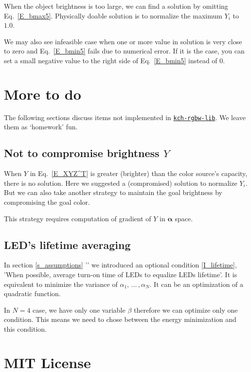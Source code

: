 \documentclass[dvipdfmx,uplatex,a4paper]{article}
\begin{document}
When the object brightness is too large, we can find a solution by omitting Eq.~\eqref{E_bmax5}. Physically doable solution is to normalize the maximum $Y_i$ to $1.0$.

We may also see infeasible case when one or more value in solution is very close to zero and Eq.~\eqref{E_bmin5} fails due to numerical error. If it is the case, you can set a small negative value to the right side of Eq.~\eqref{E_bmin5} instead of $0$.



\section{More to do}

The following sections discuss items not implemented in \href{https://www.npmjs.com/package/kch-rgbw-lib}{\texttt{kch-rgbw-lib}}. We leave them as `homework' fun.

\subsection{Not to compromise brightness $Y$}
When $Y$ in Eq.~\eqref{E_XYZ^T} is greater (brighter) than the color source's capacity, there is no solution. Here we suggested a (compromised) solution to normalize $Y_i$. But we can also take another strategy to maintain the goal brightness by compromising the goal color.

This strategy requires computation of gradient of $Y$ in $\boldsymbol{\alpha}$ space.


\subsection{LED's lifetime averaging}
In section \ref{s_assumptions} '' we introduced an optional condition \ref{I_lifetime}, 'When possible, average turn-on time of LEDs to equalize LEDs lifetime'. It is equivalent to minimize the variance of $\alpha_1, \, \ldots\, , \alpha_N$. It can be an optimization of a quadratic function.

In $N = 4$ case, we have only one variable $\beta$ therefore we can optimize only one condition. This means we need to chose between the energy minimization and this condition.






\section*{MIT License}
\end{document}
